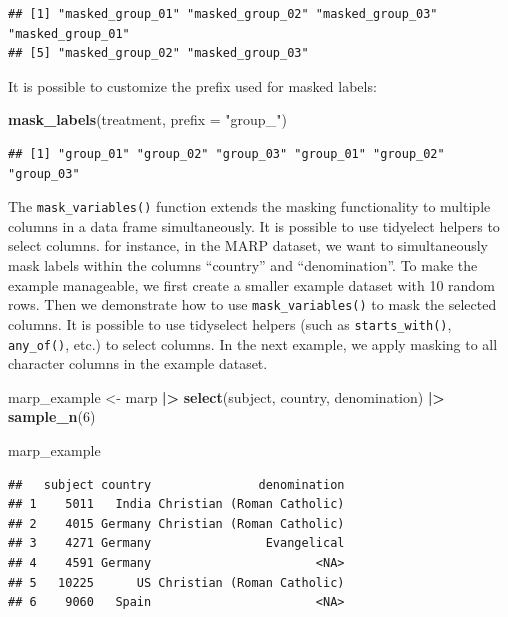 \documentclass[
  english,
  man,floatsintext]{apa6}
\newenvironment{Shaded}{\begin{snugshade}}{\end{snugshade}}
\newcommand{\AttributeTok}[1]{\textcolor[rgb]{0.13,0.29,0.53}{#1}}
\newcommand{\DecValTok}[1]{\textcolor[rgb]{0.00,0.00,0.81}{#1}}
\newcommand{\FunctionTok}[1]{\textcolor[rgb]{0.13,0.29,0.53}{\textbf{#1}}}
\newcommand{\NormalTok}[1]{#1}
\newcommand{\OtherTok}[1]{\textcolor[rgb]{0.56,0.35,0.01}{#1}}
\newcommand{\SpecialCharTok}[1]{\textcolor[rgb]{0.81,0.36,0.00}{\textbf{#1}}}
\newcommand{\StringTok}[1]{\textcolor[rgb]{0.31,0.60,0.02}{#1}}
\begin{document}
\begin{verbatim}
## [1] "masked_group_01" "masked_group_02" "masked_group_03" "masked_group_01"
## [5] "masked_group_02" "masked_group_03"
\end{verbatim}

It is possible to customize the prefix used for masked labels:

\begin{Shaded}
\begin{Highlighting}[]
\FunctionTok{mask\_labels}\NormalTok{(treatment, }\AttributeTok{prefix =} \StringTok{"group\_"}\NormalTok{)}
\end{Highlighting}
\end{Shaded}

\begin{verbatim}
## [1] "group_01" "group_02" "group_03" "group_01" "group_02" "group_03"
\end{verbatim}

The \texttt{mask\_variables()} function extends the masking functionality to multiple columns in a data frame simultaneously. It is possible to use tidyelect helpers to select columns. for instance, in the MARP dataset, we want to simultaneously mask labels within the columns ``country'' and ``denomination''. To make the example manageable, we first create a smaller example dataset with 10 random rows. Then we demonstrate how to use \texttt{mask\_variables()} to mask the selected columns. It is possible to use tidyselect helpers (such as \texttt{starts\_with()}, \texttt{any\_of()}, etc.) to select columns. In the next example, we apply masking to all character columns in the example dataset.

\begin{Shaded}
\begin{Highlighting}[]
\NormalTok{marp\_example }\OtherTok{\textless{}{-}}
\NormalTok{    marp }\SpecialCharTok{|\textgreater{}}
    \FunctionTok{select}\NormalTok{(subject, country, denomination) }\SpecialCharTok{|\textgreater{}} 
    \FunctionTok{sample\_n}\NormalTok{(}\DecValTok{6}\NormalTok{)}

\NormalTok{marp\_example}
\end{Highlighting}
\end{Shaded}

\begin{verbatim}
##   subject country               denomination
## 1    5011   India Christian (Roman Catholic)
## 2    4015 Germany Christian (Roman Catholic)
## 3    4271 Germany                Evangelical
## 4    4591 Germany                       <NA>
## 5   10225      US Christian (Roman Catholic)
## 6    9060   Spain                       <NA>
\end{verbatim}
\end{document}

